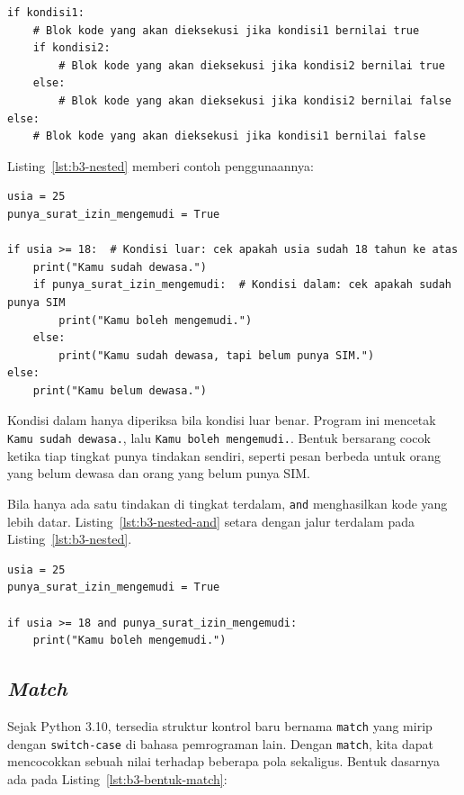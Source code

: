 \begin{lstlisting}[style=PythonStyle, caption={Bentuk dasar nested-if}, label={lst:b3-bentuk-nested}]
if kondisi1:
    # Blok kode yang akan dieksekusi jika kondisi1 bernilai true
    if kondisi2:
        # Blok kode yang akan dieksekusi jika kondisi2 bernilai true
    else:
        # Blok kode yang akan dieksekusi jika kondisi2 bernilai false
else:
    # Blok kode yang akan dieksekusi jika kondisi1 bernilai false
\end{lstlisting}

Listing~\ref{lst:b3-nested} memberi contoh penggunaannya:

\begin{lstlisting}[style=PythonStyle, caption={Kode Python: nested_if_statement.py}, label={lst:b3-nested}]
usia = 25
punya_surat_izin_mengemudi = True

if usia >= 18:  # Kondisi luar: cek apakah usia sudah 18 tahun ke atas
    print("Kamu sudah dewasa.")
    if punya_surat_izin_mengemudi:  # Kondisi dalam: cek apakah sudah punya SIM
        print("Kamu boleh mengemudi.")
    else:
        print("Kamu sudah dewasa, tapi belum punya SIM.")
else:
    print("Kamu belum dewasa.")
\end{lstlisting}

Kondisi dalam hanya diperiksa bila kondisi luar benar. Program ini mencetak \texttt{Kamu sudah dewasa.}, lalu \texttt{Kamu boleh mengemudi.}. Bentuk bersarang cocok ketika tiap tingkat punya tindakan sendiri, seperti pesan berbeda untuk orang yang belum dewasa dan orang yang belum punya SIM.

Bila hanya ada satu tindakan di tingkat terdalam, \texttt{and} menghasilkan kode yang lebih datar. Listing~\ref{lst:b3-nested-and} setara dengan jalur terdalam pada Listing~\ref{lst:b3-nested}.

\begin{lstlisting}[style=PythonStyle, caption={Kode Python: nested_dengan_and.py}, label={lst:b3-nested-and}]
usia = 25
punya_surat_izin_mengemudi = True

if usia >= 18 and punya_surat_izin_mengemudi:
    print("Kamu boleh mengemudi.")
\end{lstlisting}

\subsection{\textit{Match}}
Sejak Python 3.10, tersedia struktur kontrol baru bernama \texttt{match} yang mirip dengan \texttt{switch-case} di bahasa pemrograman lain. Dengan \texttt{match}, kita dapat mencocokkan sebuah nilai terhadap beberapa pola sekaligus. Bentuk dasarnya ada pada Listing~\ref{lst:b3-bentuk-match}:

